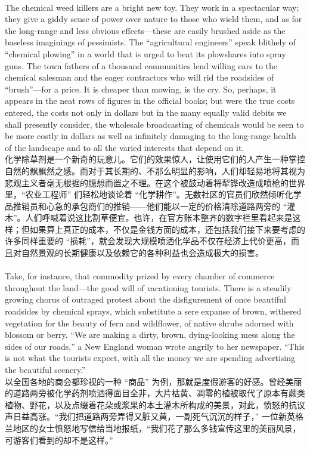 \documentclass{article}
\begin{document}
\\
The chemical weed killers are a bright new toy. They work in a spectacular way; they give a giddy sense of power over nature to those who wield them, and as for the long-range and less obvious effects—these are easily brushed aside as the baseless imaginings of pessimists. The “agricultural engineers” speak blithely of “chemical plowing” in a world that is urged to beat its plowshares into spray guns. The town fathers of a thousand communities lend willing ears to the chemical salesman and the eager contractors who will rid the roadsides of “brush”—for a price. It is cheaper than mowing, is the cry. So, perhaps, it appears in the neat rows of figures in the official books; but were the true costs entered, the costs not only in dollars but in the many equally valid debits we shall presently consider, the wholesale broadcasting of chemicals would be seen to be more costly in dollars as well as infinitely damaging to the long-range health of the landscape and to all the varied interests that depend on it.\\
化学除草剂是一个新奇的玩意儿。它们的效果惊人，让使用它们的人产生一种掌控自然的飘飘然之感。而对于其长期的、不那么明显的影响，人们却轻易地将其视为悲观主义者毫无根据的臆想而置之不理。在这个被鼓动着将犁铧改造成喷枪的世界里，“农业工程师” 们轻松地谈论着 “化学耕作”。无数社区的官员们欣然倾听化学品推销员和心急的承包商们的推销——他们能以一定的价格清除道路两旁的 “灌木”。人们呼喊着说这比割草便宜。也许，在官方账本整齐的数字栏里看起来是这样；但如果算上真正的成本，不仅是金钱方面的成本，还包括我们接下来要考虑的许多同样重要的 “损耗”，就会发现大规模喷洒化学品不仅在经济上代价更高，而且对自然景观的长期健康以及依赖它的各种利益也会造成极大的损害。 \\

\\
Take, for instance, that commodity prized by every chamber of commerce throughout the land—the good will of vacationing tourists. There is a steadily growing chorus of outraged protest about the disfigurement of once beautiful roadsides by chemical sprays, which substitute a sere expanse of brown, withered vegetation for the beauty of fern and wildflower, of native shrubs adorned with blossom or berry. “We are making a dirty, brown, dying-looking mess along the sides of our roads,” a New England woman wrote angrily to her newspaper. “This is not what the tourists expect, with all the money we are spending advertising the beautiful scenery.”\\
以全国各地的商会都珍视的一种 “商品” 为例，那就是度假游客的好感。曾经美丽的道路两旁被化学药剂喷洒得面目全非，大片枯黄、凋零的植被取代了原本有蕨类植物、野花，以及点缀着花朵或浆果的本土灌木所构成的美景，对此，愤怒的抗议声日益高涨。“我们把道路两旁弄得又脏又黄，一副死气沉沉的样子，” 一位新英格兰地区的女士愤怒地写信给当地报纸，“我们花了那么多钱宣传这里的美丽风景，可游客们看到的却不是这样。”\\
\end{document}
